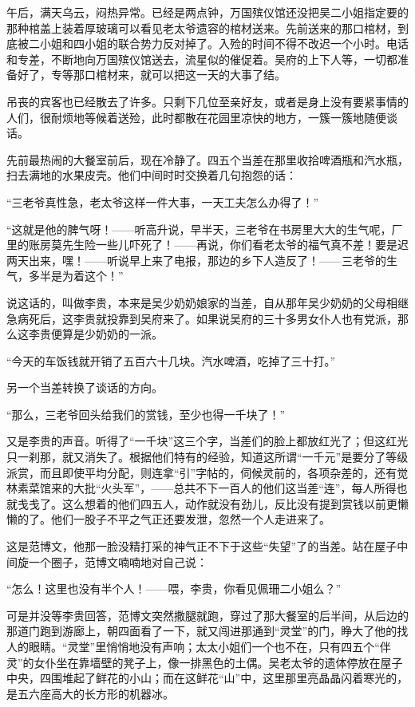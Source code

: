 \par 午后，满天乌云，闷热异常。已经是两点钟，万国殡仪馆还没把吴二小姐指定要的那种棺盖上装着厚玻璃可以看见老太爷遗容的棺材送来。先前送来的那口棺材，到底被二小姐和四小姐的联合势力反对掉了。入殓的时间不得不改迟一个小时。电话和专差，不断地向万国殡仪馆送去，流星似的催促着。吴府的上下人等，一切都准备好了，专等那口棺材来，就可以把这一天的大事了结。
\par 吊丧的宾客也已经散去了许多。只剩下几位至亲好友，或者是身上没有要紧事情的人们，很耐烦地等候着送殓，此时都散在花园里凉快的地方，一簇一簇地随便谈话。
\par 先前最热闹的大餐室前后，现在冷静了。四五个当差在那里收拾啤酒瓶和汽水瓶，扫去满地的水果皮壳。他们中间时时交换着几句抱怨的话：
\par “三老爷真性急，老太爷这样一件大事，一天工夫怎么办得了！”
\par “这就是他的脾气呀！——听高升说，早半天，三老爷在书房里大大的生气呢，厂里的账房莫先生险一些儿吓死了！——再说，你们看老太爷的福气真不差！要是迟两天出来，嘿！——听说早上来了电报，那边的乡下人造反了！——三老爷的生气，多半是为着这个！”
\par 说这话的，叫做李贵，本来是吴少奶奶娘家的当差，自从那年吴少奶奶的父母相继急病死后，这李贵就投靠到吴府来了。如果说吴府的三十多男女仆人也有党派，那么这李贵便算是少奶奶的一派。
\par “今天的车饭钱就开销了五百六十几块。汽水啤酒，吃掉了三十打。”
\par 另一个当差转换了谈话的方向。
\par “那么，三老爷回头给我们的赏钱，至少也得一千块了！”
\par 又是李贵的声音。听得了“一千块”这三个字，当差们的脸上都放红光了；但这红光只一刹那，就又消失了。根据他们特有的经验，知道这所谓“一千元”是要分了等级派赏，而且即使平均分配，则连拿“引”字帖的，伺候灵前的，各项杂差的，还有觉林素菜馆来的大批“火头军”，——总共不下一百人的他们这当差“连”，每人所得也就戋戋了。这么想着的他们四五人，动作就没有劲儿，反比没有提到赏钱以前更懒懒的了。他们一股子不平之气正还要发泄，忽然一个人走进来了。
\par 这是范博文，他那一脸没精打采的神气正不下于这些“失望”了的当差。站在屋子中间旋一个圈子，范博文喃喃地对自己说：
\par “怎么！这里也没有半个人！——喂，李贵，你看见佩珊二小姐么？”
\par 可是并没等李贵回答，范博文突然撒腿就跑，穿过了那大餐室的后半间，从后边的那道门跑到游廊上，朝四面看了一下，就又闯进那通到“灵堂”的门，睁大了他的找人的眼睛。“灵堂”里悄悄地没有声响；太太小姐们一个也不在，只有四五个“伴灵”的女仆坐在靠墙壁的凳子上，像一排黑色的土偶。吴老太爷的遗体停放在屋子中央，四围堆起了鲜花的小山；而在这鲜花“山”中，这里那里亮晶晶闪着寒光的，是五六座高大的长方形的机器冰。
